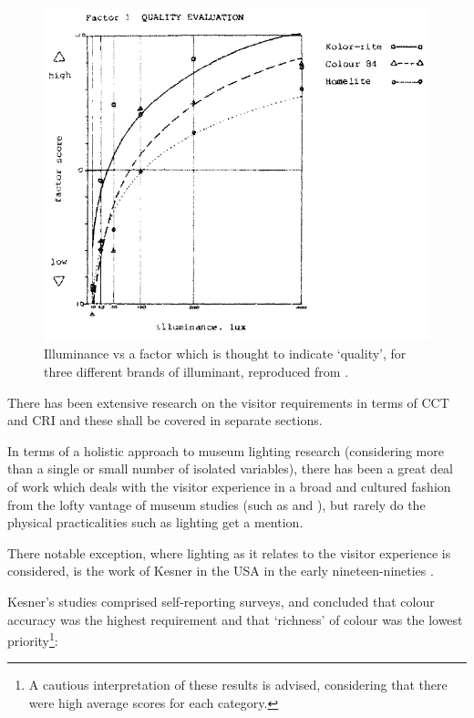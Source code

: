 \begin{figure}[htbp]
\includegraphics[max width=\textwidth]{figs/LitRev/Loe.png}
\caption{Illuminance vs a factor which is thought to indicate `quality', for three different brands of illuminant, reproduced from \citet{loe_preferred_1982}.}
\label{fig:Loe}
\end{figure}

There has been extensive research on the visitor requirements in terms of \gls{CCT} and \gls{CRI} and these shall be covered in separate sections.

In terms of a holistic approach to museum lighting research (considering more than a single or small number of isolated variables), there has been a great deal of work which deals with the visitor experience in a broad and cultured fashion from the lofty vantage of museum studies (such as \citet{falk_museum_2016} and \citet{shapiro_museum_1990}), but rarely do the physical practicalities such as lighting get a mention. 

There notable exception, where lighting as it relates to the visitor experience is considered, is the work of Kesner in the USA in the early nineteen-nineties \citep{kesner_museum_1993-1,kesner_museum_1993,kesner_exhibition_1992,kesner_current_1991,kesner_analysis_1997}.

Kesner's studies comprised self-reporting surveys, and concluded that colour accuracy was the highest requirement and that `richness' of colour was the lowest priority\footnote{A cautious interpretation of these results is advised, considering that there were high average scores for each category.}:

